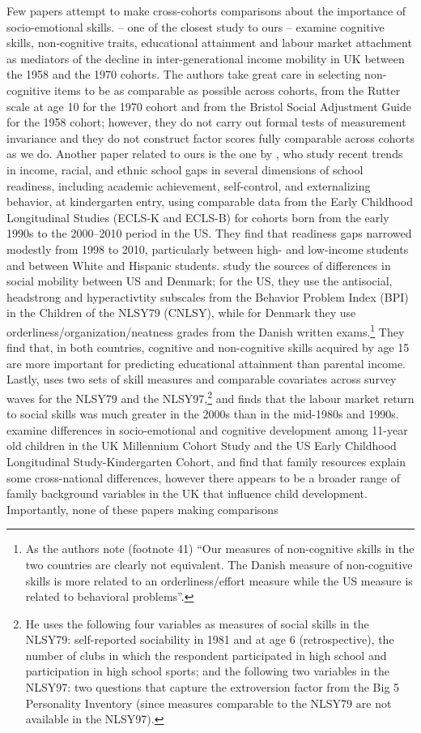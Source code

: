 Few papers attempt to make cross-cohorts comparisons about the importance of socio-emotional skills. \citet{Blanden2007} -- one of the closest study to ours -- examine cognitive skills, non‐cognitive traits, educational attainment and labour market attachment as mediators of the decline in inter-generational income mobility in UK between the 1958 and the 1970 cohorts. The authors take great care in selecting non-cognitive items to be as comparable as possible across cohorts, from the Rutter scale at age 10 for the 1970 cohort and from the Bristol Social Adjustment Guide for the 1958 cohort; however, they do not carry out formal tests of measurement invariance and they do not construct factor scores fully comparable across cohorts as we do. Another paper related to ours is the one by \citet{Reardon2016}, who study recent trends in income, racial, and ethnic school gaps in several dimensions of school readiness, including academic achievement, self-control, and externalizing behavior, at kindergarten entry, using comparable data from the Early Childhood Longitudinal Studies (ECLS-K and ECLS-B) for cohorts born from the early 1990s to the 2000–2010 period in the US. They find that readiness gaps narrowed modestly from 1998 to 2010, particularly between high- and low-income students and between White and Hispanic students. \citet{Landerso2017a} study the sources of differences in social mobility between US and Denmark; for the US, they use the antisocial, headstrong and hyperactivtity subscales from the Behavior Problem Index (BPI) in the Children of the NLSY79 (CNLSY), while for Denmark they use orderliness/organization/neatness grades from the Danish written exams.\footnote{As the authors note (footnote 41) ``Our measures of non-cognitive skills in the two countries are clearly not equivalent. The Danish measure of non-cognitive skills is more related to an orderliness/effort measure while the US measure is related to behavioral problems''.} They find that, in both countries, cognitive and non-cognitive skills acquired by age 15 are more important for predicting educational attainment than parental income. Lastly, \citet{Deming2017} uses two sets of skill measures and comparable covariates across survey waves for the NLSY79 and the NLSY97,\footnote{He uses the following four variables as measures of social skills in the NLSY79: self-reported sociability in 1981 and at age 6 (retrospective), the number of clubs in which the respondent participated in high school and participation in high school sports; and the following two variables in the NLSY97: two questions that capture the extroversion factor from the Big 5 Personality Inventory (since measures comparable to the NLSY79 are not available in the NLSY97).} and finds that the labour market return to social skills was much greater in the 2000s than in the mid-1980s and 1990s. \citet{Zilanawala2019} examine differences in socio-emotional and cognitive development among 11-year old children in the UK Millennium Cohort Study and the US Early Childhood Longitudinal Study-Kindergarten Cohort, and find that family resources explain some cross-national differences, however there appears to be a broader range of family background variables in the UK that influence child development. Importantly, none of these papers making comparisons 